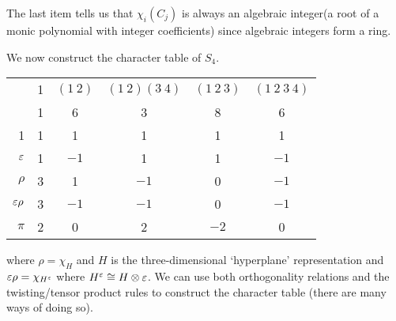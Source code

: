 \begin{rmk}
  The last item tells us that $\chi_i(C_j)$ is always an algebraic integer(a root of a monic polynomial with integer coefficients) since algebraic integers form a ring.
\end{rmk}

\begin{exam}
  We now construct the character table of $S_4$.
  \begin{center}
    \begin{tabular}[]{r | c c c c c}
      & 1 & $(1\ 2)$ & $(1\ 2)(3\ 4)$ & $(1\ 2\ 3)$ & $(1\ 2\ 3\ 4)$ \\
      & 1 & 6 & 3 & 8 & 6 \\ \hline
      1 & 1 & 1 & 1 & 1 & 1 \\
      $\varepsilon$ & 1 & $-1$ & 1 & 1 & $-1$ \\
      $\rho$ & 3 & 1 & $-1$ & 0 & $-1$ \\
      $\varepsilon\rho$ & 3 & $-1$ & $-1$ & 0 & $-1$ \\
      $\pi$ & 2 & 0 & 2 & $-2$ & 0
    \end{tabular}
  \end{center}
  where $\rho = \chi_H$ and $H$ is the three-dimensional `hyperplane' representation and $\varepsilon\rho = \chi_{H^\varepsilon}$ where $H^\varepsilon \cong H \otimes \varepsilon$.
  We can use both orthogonality relations and the twisting/tensor product rules to construct the character table (there are many ways of doing so).
\end{exam}

